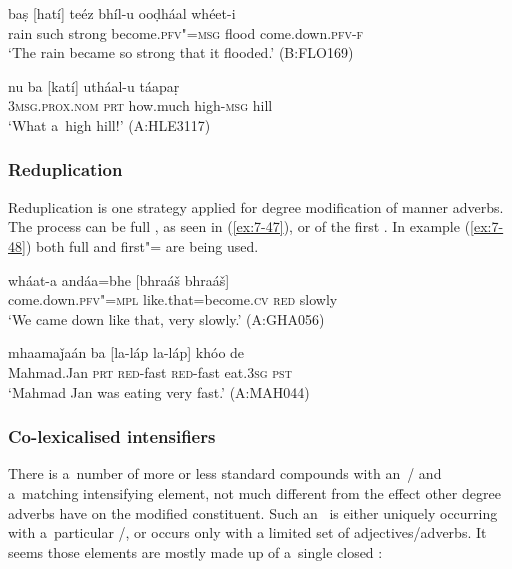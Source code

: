 \begin{exe}
\ex
\label{ex:7-45}
\gll baṣ [hatí] teéz bhíl-u ooḍháal whéet-i \\
rain such strong become.\textsc{pfv"=msg} flood come.down.\textsc{pfv-f} \\
\glt `The rain became so strong that it flooded.' (B:FLO169)
\end{exe}
\begin{exe}
\ex
\label{ex:7-46}
\gll nu ba [katí] utháal-u táapaṛ \\
\textsc{3msg.prox.nom} \textsc{prt} how.much high-\textsc{msg}  hill  \\
\glt `What a~high hill!' (A:HLE3117)
\end{exe}

\subsubsection*{Reduplication}

Reduplication is one strategy applied for degree modification of manner adverbs. The process can be
full , as seen in (\ref{ex:7-47}), or  of the first . In example
(\ref{ex:7-48}) both full and first"=  are being used.

\begin{exe}
\ex
\label{ex:7-47}
\gll wháat-a andáa=bhe [bhraáš bhraáš] \\
come.down.\textsc{pfv"=mpl} like.that=become.\textsc{cv} \textsc{red} slowly  \\
\glt `We came down like that, very slowly.' (A:GHA056)
\end{exe}
\begin{exe}
\ex
\label{ex:7-48}
\gll mhaamaǰaán ba [la-láp la-láp] khóo de \\
Mahmad.Jan \textsc{prt} \textsc{red}-fast \textsc{red}-fast eat.\textsc{3sg} \textsc{pst } \\
\glt `Mahmad Jan was eating very fast.' (A:MAH044)
\end{exe}

\subsubsection*{Co-lexicalised intensifiers}

There is a~number of more or less standard compounds with an~/ and a~matching intensifying
element, not much different from the effect
other degree adverbs have on the modified constituent. Such an~ is either uniquely occurring with a~particular /, or occurs only with a limited set of adjectives/adverbs. It seems those elements are mostly made up of a~single closed :


